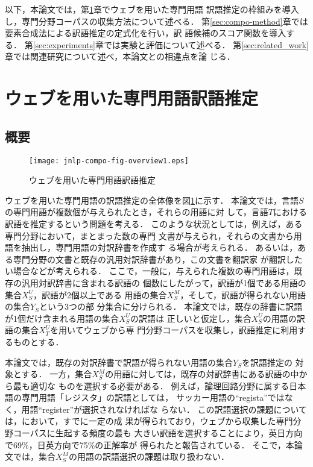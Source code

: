\documentclass[japanese]{jnlp_1.3a}
\begin{document}
以下，本論文では，第\ref{sec:web_yakugosuitei}章でウェブを用いた専門用語
訳語推定の枠組みを導入し，専門分野コーパスの収集方法について述べる．
第\ref{sec:compo-method}章では要素合成法による訳語推定の定式化を行い，訳
語候補のスコア関数を導入する．
第\ref{sec:experiments}章では実験と評価について述べる．
第\ref{sec:related_work}章では関連研究について述べ，本論文との相違点を論
じる．



\section{ウェブを用いた専門用語訳語推定}
\label{sec:web_yakugosuitei}

\subsection{概要}


\begin{figure}[b]
 \centering
     \texttt{[image: jnlp-compo-fig-overview1.eps]}
 \caption{ウェブを用いた専門用語訳語推定}
 \label{fig:overview1}
\end{figure}

ウェブを用いた専門用語の訳語推定の全体像を図\ref{fig:overview1}に示す．
本論文では，言語$S$の専門用語が複数個が与えられたとき，それらの用語に対
して，言語$T$における訳語を推定するという問題を考える．
このような状況としては，例えば，ある専門分野において，まとまった数の専門
文書が与えられ，それらの文書から用語を抽出し，専門用語の対訳辞書を作成す
る場合が考えられる．
あるいは，ある専門分野の文書と既存の汎用対訳辞書があり，この文書を翻訳家
が翻訳したい場合などが考えられる．
ここで，一般に，与えられた複数の専門用語は，既存の汎用対訳辞書に含まれる訳語の
個数にしたがって，訳語が1個である用語の集合$X_S^U$，訳語が2個以上である
用語の集合$X_S^M$，そして，訳語が得られない用語の集合$Y_S$という3つの部
分集合に分けられる．
本論文では，既存の辞書に訳語が1個だけ含まれる用語の集合$X_S^U$の訳語は
正しいと仮定し，集合$X_S^U$の用語の訳語の集合$X_T^U$を用いてウェブから専
門分野コーパスを収集し，訳語推定に利用するものとする．

本論文では，既存の対訳辞書で訳語が得られない用語の集合$Y_S$を訳語推定の
対象とする．
一方，集合$X_S^M$の用語に対しては，既存の対訳辞書にある訳語の中から最も適切な
ものを選択する必要がある．
例えば，論理回路分野に属する日本語の専門用語「レジスタ」の訳語としては，
サッカー用語の``regista''ではなく，用語``register''が選択されなければな
らない．
この訳語選択の課題については，\cite{Tonoike05cs}において，すでに一定の成
果が得られており，ウェブから収集した専門分野コーパスに生起する頻度の最も
大きい訳語を選択することにより，英日方向で69\%，日英方向で75\%の正解率が
得られたと報告されている．
そこで，本論文では，集合$X_S^M$の用語の訳語選択の課題は取り扱わない．
\end{document}
